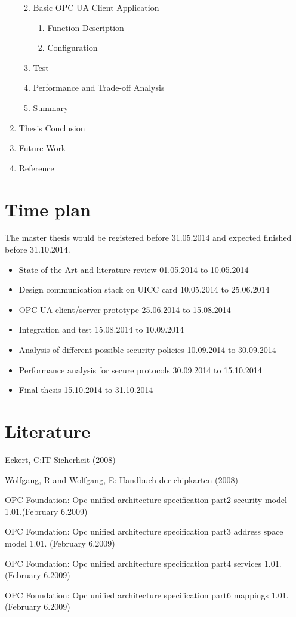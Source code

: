 \documentclass[]{llncs}
\begin{document}
\begin{enumerate}
\begin{enumerate}[label*=\arabic*.]
\begin{enumerate}[label*=\arabic*.]
		\end{enumerate}
    	\item Basic OPC UA Client Application
		\begin{enumerate}[label*=\arabic*.]
		\item Function Description
		\item Configuration
		\end{enumerate}
    	\item Test
    	\item Performance and Trade-off Analysis
    	\item Summary
	\end{enumerate}
	\item Thesis Conclusion
	\item Future Work
	\item Reference
\end{enumerate}

\section{Time plan}
The master thesis would be registered before 31.05.2014 and expected finished before 31.10.2014.
\begin{itemize}
\item State-of-the-Art and literature review		\hfill 01.05.2014 to 10.05.2014
\item Design communication stack on UICC card 		 \hfill 10.05.2014 to 25.06.2014
\item OPC UA client/server prototype 		\hfill 25.06.2014 to 15.08.2014
\item Integration and test		\hfill 15.08.2014 to 10.09.2014
\item Analysis of different possible security policies \hfill 10.09.2014 to 30.09.2014
\item Performance analysis for secure protocols \hfill 30.09.2014 to 15.10.2014
\item Final thesis \hfill 15.10.2014 to 31.10.2014
\end{itemize}

\section{Literature}
Eckert, C:IT-Sicherheit (2008)

Wolfgang, R and Wolfgang, E: Handbuch der chipkarten (2008)

OPC Foundation: Opc unified architecture specification part2 security model 1.01.(February 6.2009)

OPC Foundation: Opc unified architecture specification part3 address space model 1.01. (February 6.2009)

OPC Foundation: Opc unified architecture specification part4 services 1.01.(February 6.2009)

OPC Foundation: Opc unified architecture specification part6 mappings 1.01.(February 6.2009)
\end{document}
